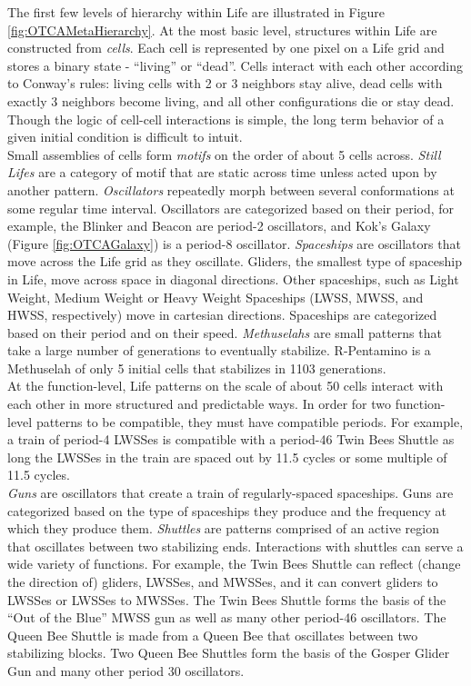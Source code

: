 {The first few levels of hierarchy within Life are illustrated in Figure \ref{fig:OTCAMetaHierarchy}.  At the most basic level, structures within Life are constructed from \textit{cells}.  Each cell is represented by one pixel on a Life grid and stores a binary state - ``living'' or ``dead''.  Cells interact with each other according to Conway's rules: living cells with 2 or 3 neighbors stay alive, dead cells with exactly 3 neighbors become living, and all other configurations die or stay dead.  Though the logic of cell-cell interactions is simple, the long term behavior of a given initial condition is difficult to intuit. \\

Small assemblies of cells form \textit{motifs} on the order of about 5 cells across.  \textit{Still Lifes} are a category of motif that are static across time unless acted upon by another pattern.  \textit{Oscillators} repeatedly morph between several conformations at some regular time interval.  Oscillators are categorized based on their period, for example, the Blinker and Beacon are period-2 oscillators, and Kok's Galaxy (Figure \ref{fig:OTCAGalaxy}) is a period-8 oscillator.  \textit{Spaceships} are oscillators that move across the Life grid as they oscillate.  Gliders, the smallest type of spaceship in Life, move across space in diagonal directions.  Other spaceships, such as Light Weight, Medium Weight or Heavy Weight Spaceships (LWSS, MWSS, and HWSS, respectively) move in cartesian directions.  Spaceships are categorized based on their period and on their speed.  \textit{Methuselahs} are small patterns that take a large number of generations to eventually stabilize.  R-Pentamino is a Methuselah of only 5 initial cells that stabilizes in 1103 generations.\\

At the function-level, Life patterns on the scale of about 50 cells interact with each other in more structured and predictable ways.  In order for two function-level patterns to be compatible, they must have compatible periods.  For example, a train of period-4 LWSSes is compatible with a period-46 Twin Bees Shuttle as long the LWSSes in the train are spaced out by 11.5 cycles or some multiple of 11.5 cycles.\\

\textit{Guns} are oscillators that create a train of regularly-spaced spaceships.  Guns are categorized based on the type of spaceships they produce and the frequency at which they produce them.  \textit{Shuttles} are patterns comprised of an active region that oscillates between two stabilizing ends.  Interactions with shuttles can serve a wide variety of functions.  For example, the Twin Bees Shuttle can reflect (change the direction of) gliders, LWSSes, and MWSSes, and it can convert gliders to LWSSes or LWSSes to MWSSes.  The Twin Bees Shuttle forms the basis of the ``Out of the Blue'' MWSS gun as well as many other period-46 oscillators.  The Queen Bee Shuttle  is made from a Queen Bee that oscillates between two stabilizing blocks.  Two Queen Bee Shuttles form the basis of the Gosper Glider Gun and many other period 30 oscillators.\\

}
